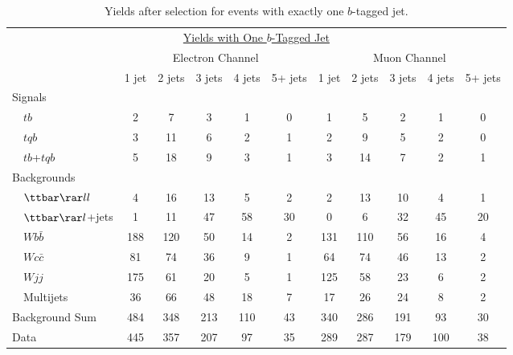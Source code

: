 \begin{table}[!h!tbp]
\begin{center}
\begin{minipage}{6.5in}
\begin{ruledtabular}
\begin{tabular}{l||ccccc|ccccc}
\multicolumn{11}{c}{\hspace{1in}\underline{Yields with One $b$-Tagged Jet}} \vspace{0.1in} \\
& \multicolumn{5}{c|}{Electron Channel} & \multicolumn{5}{c}{Muon Channel} \\
                         & 1 jet & 2 jets & 3 jets & 4 jets & 5+ jets
                         & 1 jet & 2 jets & 3 jets & 4 jets & 5+ jets \\
\hline
Signals                  &      &       &      &      &      &      &      &      &      &      \\
~~$tb$                   &    2 &     7 &    3 &    1 &    0 &    1 &    5 &    2 &    1 &    0 \\
~~$tqb$                  &    3 &    11 &    6 &    2 &    1 &    2 &    9 &    5 &    2 &    0 \\
~~$tb$+$tqb$             &    5 &    18 &    9 &    3 &    1 &    3 &   14 &    7 &    2 &    1 \\
Backgrounds              &      &       &      &      &      &      &      &      &      &      \\
~~${\ttbar}{\rar}ll$     &    4 &    16 &   13 &    5 &    2 &    2 &   13 &   10 &    4 &    1 \\
~~${\ttbar}{\rar}l$+jets &    1 &    11 &   47 &   58 &   30 &    0 &    6 &   32 &   45 &   20 \\
~~$Wb\bar{b}$            &  188 &   120 &   50 &   14 &    2 &  131 &  110 &   56 &   16 &    4 \\
~~$Wc\bar{c}$            &   81 &    74 &   36 &    9 &    1 &   64 &   74 &   46 &   13 &    2 \\
~~$Wjj$                  &  175 &    61 &   20 &    5 &    1 &  125 &   58 &   23 &    6 &    2 \\
~~Multijets              &   36 &    66 &   48 &   18 &    7 &   17 &   26 &   24 &    8 &    2 \\
\hline					       		    	    	  	  
Background Sum           &  484 &   348 &  213 &  110 &   43 &  340 &  286 &  191 &   93 &   30 \\
\hline					       		    	    	  	  
Data                     &  445 &   357 &  207 &   97 &   35 &  289 &  287 &  179 &  100 &   38
\end{tabular}
\end{ruledtabular}
\vspace{-0.1in}
\caption[onetagyields]{Yields after selection for events with exactly one $b$-tagged jet.}
\label{onetag-yields}
\end{minipage}
\end{center}
\end{table}

